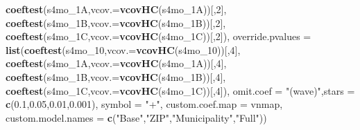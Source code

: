 \documentclass[
]{article}
\newenvironment{Shaded}{\begin{snugshade}}{\end{snugshade}}
\newcommand{\DataTypeTok}[1]{\textcolor[rgb]{0.13,0.29,0.53}{#1}}
\newcommand{\DecValTok}[1]{\textcolor[rgb]{0.00,0.00,0.81}{#1}}
\newcommand{\FloatTok}[1]{\textcolor[rgb]{0.00,0.00,0.81}{#1}}
\newcommand{\KeywordTok}[1]{\textcolor[rgb]{0.13,0.29,0.53}{\textbf{#1}}}
\newcommand{\NormalTok}[1]{#1}
\newcommand{\StringTok}[1]{\textcolor[rgb]{0.31,0.60,0.02}{#1}}
\begin{document}
\begin{Shaded}
\begin{Highlighting}[]
                             \KeywordTok{coeftest}\NormalTok{(s4mo_1A,}\DataTypeTok{vcov.=}\KeywordTok{vcovHC}\NormalTok{(s4mo_1A))[,}\DecValTok{2}\NormalTok{],}
                             \KeywordTok{coeftest}\NormalTok{(s4mo_1B,}\DataTypeTok{vcov.=}\KeywordTok{vcovHC}\NormalTok{(s4mo_1B))[,}\DecValTok{2}\NormalTok{],}
                             \KeywordTok{coeftest}\NormalTok{(s4mo_1C,}\DataTypeTok{vcov.=}\KeywordTok{vcovHC}\NormalTok{(s4mo_1C))[,}\DecValTok{2}\NormalTok{]),}
          \DataTypeTok{override.pvalues =} \KeywordTok{list}\NormalTok{(}\KeywordTok{coeftest}\NormalTok{(s4mo_}\DecValTok{10}\NormalTok{,}\DataTypeTok{vcov.=}\KeywordTok{vcovHC}\NormalTok{(s4mo_}\DecValTok{10}\NormalTok{))[,}\DecValTok{4}\NormalTok{],}
                                  \KeywordTok{coeftest}\NormalTok{(s4mo_1A,}\DataTypeTok{vcov.=}\KeywordTok{vcovHC}\NormalTok{(s4mo_1A))[,}\DecValTok{4}\NormalTok{],}
                                  \KeywordTok{coeftest}\NormalTok{(s4mo_1B,}\DataTypeTok{vcov.=}\KeywordTok{vcovHC}\NormalTok{(s4mo_1B))[,}\DecValTok{4}\NormalTok{],}
                                  \KeywordTok{coeftest}\NormalTok{(s4mo_1C,}\DataTypeTok{vcov.=}\KeywordTok{vcovHC}\NormalTok{(s4mo_1C))[,}\DecValTok{4}\NormalTok{]),}
          \DataTypeTok{omit.coef =} \StringTok{"(wave)"}\NormalTok{,}\DataTypeTok{stars =} \KeywordTok{c}\NormalTok{(}\FloatTok{0.1}\NormalTok{,}\FloatTok{0.05}\NormalTok{,}\FloatTok{0.01}\NormalTok{,}\FloatTok{0.001}\NormalTok{), }\DataTypeTok{symbol =} \StringTok{"+"}\NormalTok{,}
          \DataTypeTok{custom.coef.map =}\NormalTok{ vnmap, }
          \DataTypeTok{custom.model.names =} \KeywordTok{c}\NormalTok{(}\StringTok{"Base"}\NormalTok{,}\StringTok{"ZIP"}\NormalTok{,}\StringTok{"Municipality"}\NormalTok{,}\StringTok{"Full"}\NormalTok{))}
\end{Highlighting}
\end{Shaded}
\end{document}
